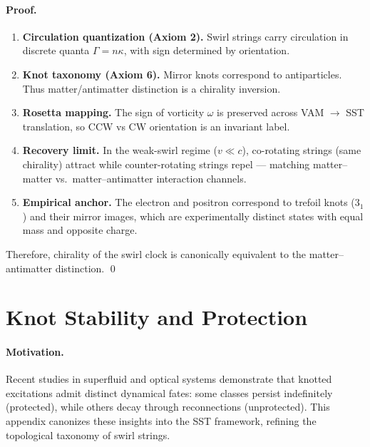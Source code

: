 \documentclass[10pt,reprint,aps,onecolumn,nofootinbib]{revtex4-2}
\begin{document}
    \paragraph{Proof.}
        \begin{enumerate}
            \item \textbf{Circulation quantization (Axiom 2).}
            Swirl strings carry circulation in discrete quanta $\Gamma = n\kappa$,
            with sign determined by orientation.
            \item \textbf{Knot taxonomy (Axiom 6).}
            Mirror knots correspond to antiparticles.
            Thus matter/antimatter distinction is a chirality inversion.
            \item \textbf{Rosetta mapping.}
            The sign of vorticity $\omega$ is preserved across VAM $\to$ SST translation,
            so CCW vs CW orientation is an invariant label.
            \item \textbf{Recovery limit.}
            In the weak-swirl regime ($v \ll c$), co-rotating strings (same chirality)
            attract while counter-rotating strings repel — matching matter–matter vs.\ matter–antimatter
            interaction channels.
            \item \textbf{Empirical anchor.}
            The electron and positron correspond to trefoil knots ($3_1$) and their mirror images,
            which are experimentally distinct states with equal mass and opposite charge.
        \end{enumerate}
        Therefore, chirality of the swirl clock is canonically equivalent to the matter–antimatter distinction.
        \qed


    \section{Knot Stability and Protection}
    \label{app:knot_protection}

    \paragraph{Motivation.}
        Recent studies in superfluid and optical systems demonstrate that knotted excitations admit distinct dynamical fates: some classes persist indefinitely (protected), while others decay through reconnections (unprotected). This appendix canonizes these insights into the SST framework, refining the topological taxonomy of swirl strings.
\end{document}
